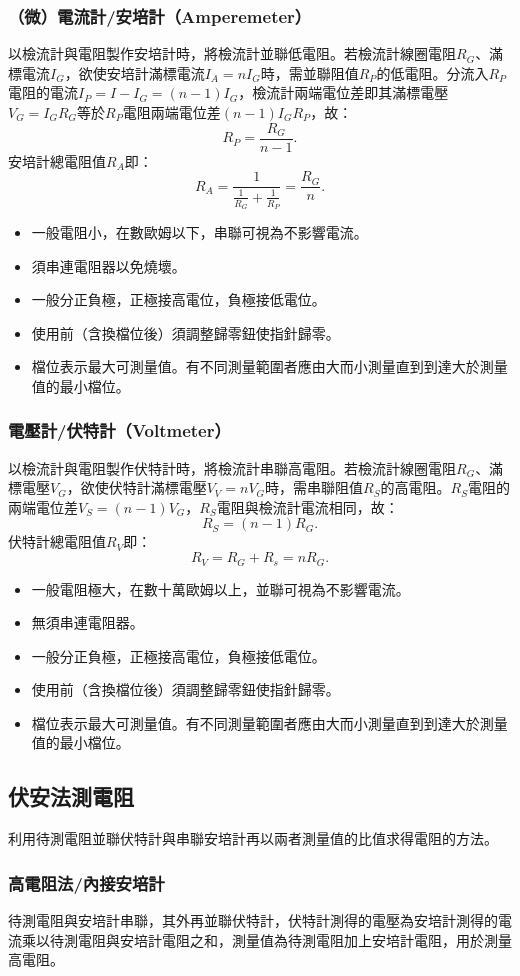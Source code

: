 \documentclass[a4paper,12pt]{report}
\begin{document}
\begin{itemize}
\subsubsection{（微）電流計/安培計（Amperemeter）}
以檢流計與電阻製作安培計時，將檢流計並聯低電阻。若檢流計線圈電阻$R_G$、滿標電流$I_G$，欲使安培計滿標電流$I_A=nI_G$時，需並聯阻值$R_P$的低電阻。分流入$R_P$電阻的電流$I_P=I-I_G=(n-1)I_G$，檢流計兩端電位差即其滿標電壓$V_G=I_GR_G$等於$R_P$電阻兩端電位差$(n-1)I_GR_P$，故：
\[R_P=\frac{R_G}{n-1}.\]
安培計總電阻值$R_A$即：
\[R_A=\frac{1}{\frac{1}{R_G}+\frac{1}{R_P}}=\frac{R_G}{n}.\]
\begin{itemize}
\item 一般電阻小，在數歐姆以下，串聯可視為不影響電流。
\item 須串連電阻器以免燒壞。
\item 一般分正負極，正極接高電位，負極接低電位。
\item 使用前（含換檔位後）須調整歸零鈕使指針歸零。
\item 檔位表示最大可測量值。有不同測量範圍者應由大而小測量直到到達大於測量值的最小檔位。
\end{itemize}
\subsubsection{電壓計/伏特計（Voltmeter）}
以檢流計與電阻製作伏特計時，將檢流計串聯高電阻。若檢流計線圈電阻$R_G$、滿標電壓$V_G$，欲使伏特計滿標電壓$V_V=nV_G$時，需串聯阻值$R_S$的高電阻。$R_S$電阻的兩端電位差$V_S=(n-1)V_G$，$R_S$電阻與檢流計電流相同，故：
\[R_S=(n-1)R_G.\]
伏特計總電阻值$R_V$即：
\[R_V=R_G+R_s=nR_G.\]
\begin{itemize}
\item 一般電阻極大，在數十萬歐姆以上，並聯可視為不影響電流。
\item 無須串連電阻器。
\item 一般分正負極，正極接高電位，負極接低電位。
\item 使用前（含換檔位後）須調整歸零鈕使指針歸零。
\item 檔位表示最大可測量值。有不同測量範圍者應由大而小測量直到到達大於測量值的最小檔位。
\end{itemize}
\subsection{伏安法測電阻}
利用待測電阻並聯伏特計與串聯安培計再以兩者測量值的比值求得電阻的方法。
\subsubsection{高電阻法/內接安培計}
待測電阻與安培計串聯，其外再並聯伏特計，伏特計測得的電壓為安培計測得的電流乘以待測電阻與安培計電阻之和，測量值為待測電阻加上安培計電阻，用於測量高電阻。

\end{itemize}
\end{document}
